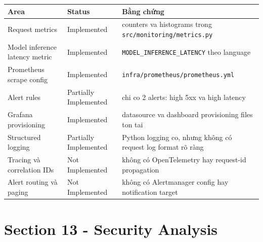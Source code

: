 \begin{table}[H]
\centering
\begin{tabularx}{\textwidth}{@{}l l X@{}}
\toprule
\textbf{Area} & \textbf{Status} & \textbf{Bằng chứng} \\
\midrule
Request metrics & Implemented & counters va histograms trong \texttt{src/monitoring/metrics.py} \\
Model inference latency metric & Implemented & \texttt{MODEL\_INFERENCE\_LATENCY} theo language \\
Prometheus scrape config & Implemented & \texttt{infra/prometheus/prometheus.yml} \\
Alert rules & Partially Implemented & chi co 2 alerts: high 5xx va high latency \\
Grafana provisioning & Implemented & datasource va dashboard provisioning files ton tai \\
Structured logging & Partially Implemented & Python logging co, nhưng không có request log format rõ ràng \\
Tracing và correlation IDs & Not Implemented & không có OpenTelemetry hay request-id propagation \\
Alert routing và paging & Not Implemented & không có Alertmanager config hay notification target \\
\bottomrule
\end{tabularx}
\end{table}

\section{Section 13 - Security Analysis}
